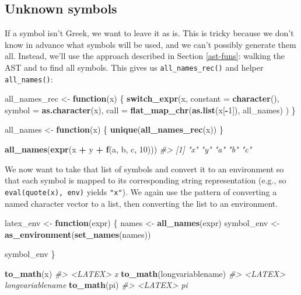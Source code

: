 \documentclass[]{book}
\newenvironment{Shaded}{\begin{snugshade}}{\end{snugshade}}
\newcommand{\CommentTok}[1]{\textcolor[rgb]{0.37,0.37,0.37}{\textit{#1}}}
\newcommand{\ControlFlowTok}[1]{\textcolor[rgb]{0.27,0.27,0.27}{\textbf{#1}}}
\newcommand{\DataTypeTok}[1]{\textcolor[rgb]{0.27,0.27,0.27}{#1}}
\newcommand{\DecValTok}[1]{\textcolor[rgb]{0.06,0.06,0.06}{#1}}
\newcommand{\KeywordTok}[1]{\textcolor[rgb]{0.27,0.27,0.27}{\textbf{#1}}}
\newcommand{\NormalTok}[1]{#1}
\newcommand{\OperatorTok}[1]{\textcolor[rgb]{0.43,0.43,0.43}{\textbf{#1}}}
\newcommand{\StringTok}[1]{\textcolor[rgb]{0.5,0.5,0.5}{#1}}
\begin{document}
\hypertarget{unknown-symbols}{%
\subsection{Unknown symbols}\label{unknown-symbols}}

If a symbol isn't Greek, we want to leave it as is. This is tricky because we don't know in advance what symbols will be used, and we can't possibly generate them all. Instead, we'll use the approach described in Section \ref{ast-funs}: walking the AST and to find all symbols. This gives us \texttt{all\_names\_rec()} and helper \texttt{all\_names()}:

\begin{Shaded}
\begin{Highlighting}[]
\NormalTok{all_names_rec <-}\StringTok{ }\ControlFlowTok{function}\NormalTok{(x) \{}
  \KeywordTok{switch_expr}\NormalTok{(x,}
    \DataTypeTok{constant =} \KeywordTok{character}\NormalTok{(),}
    \DataTypeTok{symbol =}   \KeywordTok{as.character}\NormalTok{(x),}
    \DataTypeTok{call =}     \KeywordTok{flat_map_chr}\NormalTok{(}\KeywordTok{as.list}\NormalTok{(x[}\OperatorTok{-}\DecValTok{1}\NormalTok{]), all_names)}
\NormalTok{  )}
\NormalTok{\}}

\NormalTok{all_names <-}\StringTok{ }\ControlFlowTok{function}\NormalTok{(x) \{}
  \KeywordTok{unique}\NormalTok{(}\KeywordTok{all_names_rec}\NormalTok{(x))}
\NormalTok{\}}

\KeywordTok{all_names}\NormalTok{(}\KeywordTok{expr}\NormalTok{(x }\OperatorTok{+}\StringTok{ }\NormalTok{y }\OperatorTok{+}\StringTok{ }\KeywordTok{f}\NormalTok{(a, b, c, }\DecValTok{10}\NormalTok{)))}
\CommentTok{#> [1] "x" "y" "a" "b" "c"}
\end{Highlighting}
\end{Shaded}

We now want to take that list of symbols and convert it to an environment so that each symbol is mapped to its corresponding string representation (e.g., so \texttt{eval(quote(x),\ env)} yields \texttt{"x"}). We again use the pattern of converting a named character vector to a list, then converting the list to an environment.

\begin{Shaded}
\begin{Highlighting}[]
\NormalTok{latex_env <-}\StringTok{ }\ControlFlowTok{function}\NormalTok{(expr) \{}
\NormalTok{  names <-}\StringTok{ }\KeywordTok{all_names}\NormalTok{(expr)}
\NormalTok{  symbol_env <-}\StringTok{ }\KeywordTok{as_environment}\NormalTok{(}\KeywordTok{set_names}\NormalTok{(names))}

\NormalTok{  symbol_env}
\NormalTok{\}}

\KeywordTok{to_math}\NormalTok{(x)}
\CommentTok{#> <LATEX> x}
\KeywordTok{to_math}\NormalTok{(longvariablename)}
\CommentTok{#> <LATEX> longvariablename}
\KeywordTok{to_math}\NormalTok{(pi)}
\CommentTok{#> <LATEX> pi}
\end{Highlighting}
\end{Shaded}
\end{document}
